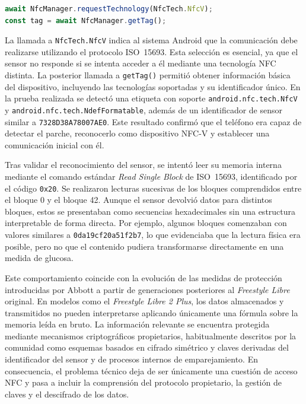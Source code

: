 \begin{lstlisting}[language=JavaScript, caption={Prueba inicial de comunicación NFC-V con el sensor}, label={cod:nfcv-inicial}, captionpos=b]
await NfcManager.requestTechnology(NfcTech.NfcV);
const tag = await NfcManager.getTag();
\end{lstlisting}

La llamada a \texttt{NfcTech.NfcV} indica al sistema Android que la comunicación debe
realizarse utilizando el protocolo ISO~15693. Esta selección es esencial, ya que el
sensor no responde si se intenta acceder a él mediante una tecnología NFC distinta. La
posterior llamada a \texttt{getTag()} permitió obtener información básica del dispositivo,
incluyendo las tecnologías soportadas y su identificador único. En la prueba realizada se
detectó una etiqueta con soporte \texttt{android.nfc.tech.NfcV} y
\texttt{android.nfc.tech.NdefFormatable}, además de un identificador de sensor similar a
\texttt{7328D38A78007AE0}. Este resultado confirmó que el teléfono era capaz de detectar
el parche, reconocerlo como dispositivo NFC-V y establecer una comunicación inicial con
él.

Tras validar el reconocimiento del sensor, se intentó leer su memoria interna mediante el
comando estándar \textit{Read Single Block} de ISO~15693, identificado por el código
\texttt{0x20}. Se realizaron lecturas sucesivas de los bloques comprendidos entre el
bloque 0 y el bloque 42. Aunque el sensor devolvió datos para distintos bloques, estos se
presentaban como secuencias hexadecimales sin una estructura interpretable de forma
directa. Por ejemplo, algunos bloques comenzaban con valores similares a
\texttt{0da19cf20a51f2b7}, lo que evidenciaba que la lectura física era posible, pero no
que el contenido pudiera transformarse directamente en una medida de glucosa.

Este comportamiento coincide con la evolución de las medidas de protección introducidas
por Abbott a partir de generaciones posteriores al \textit{Freestyle Libre} original. En
modelos como el \textit{Freestyle Libre 2 Plus}, los datos almacenados y transmitidos no
pueden interpretarse aplicando únicamente una fórmula sobre la memoria leída en bruto. La
información relevante se encuentra protegida mediante mecanismos criptográficos
propietarios, habitualmente descritos por la comunidad como esquemas basados en cifrado
simétrico y claves derivadas del identificador del sensor y de procesos internos de
emparejamiento. En consecuencia, el problema técnico deja de ser únicamente una cuestión
de acceso NFC y pasa a incluir la comprensión del protocolo propietario, la gestión de
claves y el descifrado de los datos.

